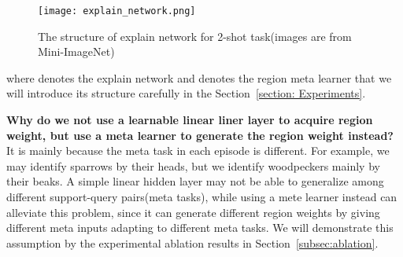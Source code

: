 \documentclass[letterpaper]{article}
\begin{document}
\begin{figure}
    \centering
    \texttt{[image: explain\_network.png]}
    \caption{The structure of explain network for 2-shot task(images are from Mini-ImageNet)}
    \label{fig:explain}
\end{figure}


where  denotes the explain network and  denotes the region meta learner that we will introduce its structure carefully in the Section~\ref{section: Experiments}. 


{\bf Why do we not use a learnable linear liner layer to acquire region weight, but use a meta learner to generate the region weight instead?} It is mainly because the meta task in each episode is different. For example, we may identify sparrows by their heads, but we identify woodpeckers mainly by their beaks. A simple linear hidden layer may not be able to generalize among different support-query pairs(meta tasks), while using a mete learner instead can alleviate this problem, since it can generate different region weights by giving different meta inputs adapting to different meta tasks. We will demonstrate this assumption by the experimental ablation results in Section~\ref{subsec:ablation}. 
\end{document}
